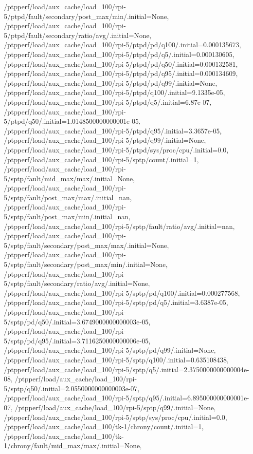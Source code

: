 {    /ptpperf/load/aux_cache/load_100/rpi-5/ptpd/fault/secondary/post_max/min/.initial=None,
    /ptpperf/load/aux_cache/load_100/rpi-5/ptpd/fault/secondary/ratio/avg/.initial=None,
    /ptpperf/load/aux_cache/load_100/rpi-5/ptpd/pd/q100/.initial=0.000135673,
    /ptpperf/load/aux_cache/load_100/rpi-5/ptpd/pd/q5/.initial=0.000130605,
    /ptpperf/load/aux_cache/load_100/rpi-5/ptpd/pd/q50/.initial=0.000132581,
    /ptpperf/load/aux_cache/load_100/rpi-5/ptpd/pd/q95/.initial=0.000134609,
    /ptpperf/load/aux_cache/load_100/rpi-5/ptpd/pd/q99/.initial=None,
    /ptpperf/load/aux_cache/load_100/rpi-5/ptpd/q100/.initial=9.1335e-05,
    /ptpperf/load/aux_cache/load_100/rpi-5/ptpd/q5/.initial=6.87e-07,
    /ptpperf/load/aux_cache/load_100/rpi-5/ptpd/q50/.initial=1.0148500000000001e-05,
    /ptpperf/load/aux_cache/load_100/rpi-5/ptpd/q95/.initial=3.3657e-05,
    /ptpperf/load/aux_cache/load_100/rpi-5/ptpd/q99/.initial=None,
    /ptpperf/load/aux_cache/load_100/rpi-5/ptpd/sys/proc/cpu/.initial=0.0,
    /ptpperf/load/aux_cache/load_100/rpi-5/sptp/count/.initial=1,
    /ptpperf/load/aux_cache/load_100/rpi-5/sptp/fault/mid_max/max/.initial=None,
    /ptpperf/load/aux_cache/load_100/rpi-5/sptp/fault/post_max/max/.initial=nan,
    /ptpperf/load/aux_cache/load_100/rpi-5/sptp/fault/post_max/min/.initial=nan,
    /ptpperf/load/aux_cache/load_100/rpi-5/sptp/fault/ratio/avg/.initial=nan,
    /ptpperf/load/aux_cache/load_100/rpi-5/sptp/fault/secondary/post_max/max/.initial=None,
    /ptpperf/load/aux_cache/load_100/rpi-5/sptp/fault/secondary/post_max/min/.initial=None,
    /ptpperf/load/aux_cache/load_100/rpi-5/sptp/fault/secondary/ratio/avg/.initial=None,
    /ptpperf/load/aux_cache/load_100/rpi-5/sptp/pd/q100/.initial=0.000277568,
    /ptpperf/load/aux_cache/load_100/rpi-5/sptp/pd/q5/.initial=3.6387e-05,
    /ptpperf/load/aux_cache/load_100/rpi-5/sptp/pd/q50/.initial=3.6749000000000003e-05,
    /ptpperf/load/aux_cache/load_100/rpi-5/sptp/pd/q95/.initial=3.7116250000000006e-05,
    /ptpperf/load/aux_cache/load_100/rpi-5/sptp/pd/q99/.initial=None,
    /ptpperf/load/aux_cache/load_100/rpi-5/sptp/q100/.initial=0.635108438,
    /ptpperf/load/aux_cache/load_100/rpi-5/sptp/q5/.initial=2.3750000000000004e-08,
    /ptpperf/load/aux_cache/load_100/rpi-5/sptp/q50/.initial=2.0550000000000003e-07,
    /ptpperf/load/aux_cache/load_100/rpi-5/sptp/q95/.initial=6.895000000000001e-07,
    /ptpperf/load/aux_cache/load_100/rpi-5/sptp/q99/.initial=None,
    /ptpperf/load/aux_cache/load_100/rpi-5/sptp/sys/proc/cpu/.initial=0.0,
    /ptpperf/load/aux_cache/load_100/tk-1/chrony/count/.initial=1,
    /ptpperf/load/aux_cache/load_100/tk-1/chrony/fault/mid_max/max/.initial=None,
}
